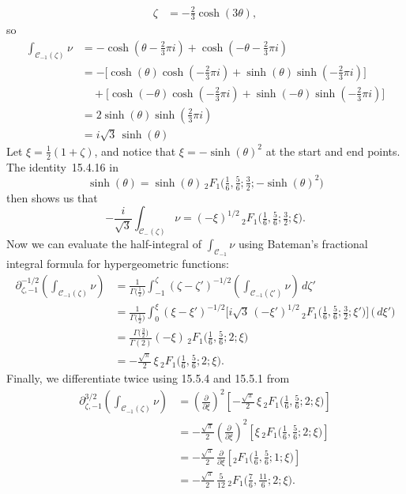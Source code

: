 \documentclass{article}
\newcommand{\fracderiv}[3]{\partial^{#1}_{#2, #3}}
\theoremstyle{definition}
\theoremstyle{plain}
\newenvironment{old}{\color{RoyalBlue}}{\color{black}}
\begin{document}
\begin{old}
\begin{align*}
\zeta & = -\tfrac{2}{3} \cosh(3\theta),
\end{align*}
so
\begin{align*}
\int_{\mathcal{C}_{-1}(\zeta)} \nu & =- \cosh(\theta - \tfrac{2}{3}\pi i) + \cosh(-\theta - \tfrac{2}{3}\pi i) \\
& =- \big[\cosh(\theta) \cosh(-\tfrac{2}{3}\pi i) + \sinh(\theta) \sinh(-\tfrac{2}{3}\pi i)\big] \\
& \quad + \big[\cosh(-\theta) \cosh(-\tfrac{2}{3}\pi i) + \sinh(-\theta) \sinh(-\tfrac{2}{3}\pi i)\big] \\
& = 2\sinh(\theta) \sinh(\tfrac{2}{3}\pi i) \\
& = i\sqrt{3}\,\sinh(\theta)
\end{align*}
Let $\xi = \tfrac{1}{2}(1 + \zeta)$, and notice that $\xi =- \sinh( \theta)^2$ at the start and end points. The identity~15.4.16 in \cite{dlmf}
\[ \sinh(\theta) = \sinh(\theta)\, {}_2F_1\big(\tfrac{1}{6}, \tfrac{5}{6}; \tfrac{3}{2}; -\sinh(\theta)^2\big) \]
then shows us that
\[ -\frac{i}{\sqrt{3}} \int_{\mathcal{C}_-(\zeta)} \nu =  (-\xi)^{1/2}\, {}_2F_1\big(\tfrac{1}{6}, \tfrac{5}{6}; \tfrac{3}{2}; \xi\big). \]
Now we can evaluate the half-integral of $\int_{\mathcal{C}_{-1}} \nu$ using Bateman's fractional integral formula for hypergeometric functions: \begin{align*}
\fracderiv{-1/2}{\zeta}{-1}\left( \int_{\mathcal{C}_{-1}(\zeta)} \nu \right) & = \frac{1}{\Gamma\big(\tfrac{1}{2}\big)} \int_{-1}^\zeta (\zeta - \zeta')^{-1/2} \left( \int_{\mathcal{C}_{-1}(\zeta')} \nu \right)\,d\zeta' \\
& = \frac{1}{\Gamma\big(\tfrac{1}{2}\big)} \int_0^\xi  (\xi - \xi')^{-1/2} \Big[{i}{\sqrt{3}}\, (-\xi')^{1/2}\, {}_2F_1\big(\tfrac{1}{6}, \tfrac{5}{6}; \tfrac{3}{2}; \xi' \big) \Big] \,\big( \,d\xi' \big) \\
& =  \frac{\Gamma\big(\tfrac{3}{2}\big)}{\Gamma(2)} (-\xi)\, {}_2F_1\big(\tfrac{1}{6}, \tfrac{5}{6}; 2; \xi\big) \\
& = - \tfrac{\sqrt{\pi}}{2}\,\xi\,{}_2F_1\big(\tfrac{1}{6}, \tfrac{5}{6}; 2; \xi\big).
\end{align*}
Finally, we differentiate twice using 15.5.4 and 15.5.1 from \cite{dlmf}
\begin{align*}
\fracderiv{3/2}{\zeta}{-1} \left( \int_{\mathcal{C}_{-1}(\zeta)} \nu \right) & = \left(\tfrac{\partial}{\partial \xi}\right)^2 \left[ - \tfrac{\sqrt{\pi}}{2} \,\xi\, {}_2F_1\big(\tfrac{1}{6}, \tfrac{5}{6}; 2; \xi\big) \right] \\
& = - \tfrac{\sqrt{\pi}}{2} \left(\tfrac{\partial}{\partial \xi}\right)^2 \left[ \xi\, {}_2F_1\big(\tfrac{1}{6}, \tfrac{5}{6}; 2; \xi\big) \right] \\
& = - \tfrac{\sqrt{\pi}}{2}\,\tfrac{\partial}{\partial \xi} \left[ {}_2F_1\big(\tfrac{1}{6}, \tfrac{5}{6}; 1; \xi\big) \right] \\
& = - \tfrac{\sqrt{\pi}}{2}\,\tfrac{5}{12}\, {}_2F_1\big(\tfrac{7}{6}, \tfrac{11}{6}; 2; \xi\big).
\end{align*}
\end{old}
\end{document}
